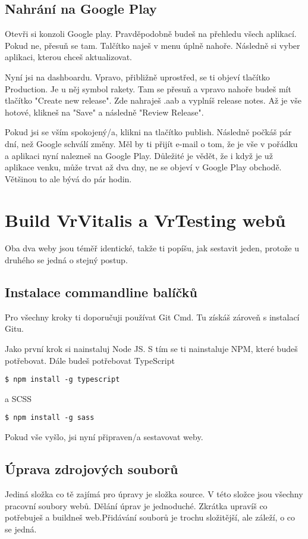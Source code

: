 \documentclass{article}
\begin{document}
\subsection{Nahrání na Google Play}
Otevři si konzoli Google play. Pravděpodobně budeš na přehledu všech aplikací. Pokud ne, přesuň se tam. Talčítko naješ v menu úplně nahoře. Následně si vyber aplikaci, kterou chceš aktualizovat.

Nyní jsi na dashboardu. Vpravo, přibližně uprostřed, se ti objeví tlačítko Production. Je u něj symbol rakety. Tam se přesuň a vpravo nahoře budeš mít tlačítko "Create new release". Zde nahraješ .aab a vyplníš release notes. Až je vše hotové, klikneš na "Save" a následně "Review Release". 

Pokud jsi se vším spokojený/a, klikni na tlačítko publish. Následně počkáš pár dní, než Google schválí změny. Měl by ti přijít e-mail o tom, že je vše v pořádku a aplikaci nyní nalezneš na Google Play. Důležité je vědět, že i když je už aplikace venku, může trvat až dva dny, ne se objeví v Google Play obchodě. Většinou to ale bývá do pár hodin.

\pagebreak

\section{Build VrVitalis a VrTesting webů}
Oba dva weby jsou téměř identické, takže ti popíšu, jak sestavit jeden, protože u druhého se jedná o stejný postup.
\subsection{Instalace commandline balíčků}
Pro všechny kroky ti doporučuji používat Git Cmd. Tu získáš zároveň s instalací Gitu.

Jako první krok si nainstaluj Node JS. S tím se ti nainstaluje NPM, které budeš potřebovat.
Dále budeš potřebovat TypeScript
\begin{lstlisting}
$ npm install -g typescript
\end{lstlisting}
a SCSS
\begin{lstlisting}
$ npm install -g sass
\end{lstlisting}
Pokud vše vyšlo, jsi nyní připraven/a sestavovat weby.
\subsection{Úprava zdrojových souborů}
Jediná složka co tě zajímá pro úpravy je složka source. V této složce jsou všechny pracovní soubory webů.
Dělání úprav je jednoduché. Zkrátka upravíš co potřebuješ a buildneš web.Přidávání souborů je trochu složitější, ale záleží, o co se jedná. 
\end{document}

